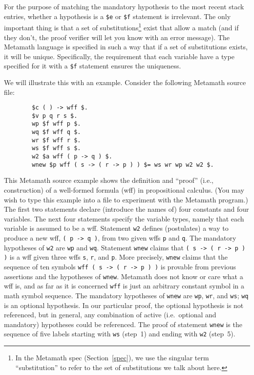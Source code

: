For the purpose of matching the mandatory hypothesis to the most recent stack
entries, whether a hypothesis is a \texttt{\$e} or \texttt{\$f} statement is
irrelevant.  The only important thing is that a set of
substitutions\footnote{In the Metamath spec (Section~\ref{spec}), we use the
singular term ``substitution'' to refer to the set of substitutions we talk
about here.} exist that allow a match (and if they don't, the proof verifier
will let you know with an error message).  The Metamath language is specified
in such a way that if a set of substitutions exists, it will be unique.
Specifically, the requirement that each variable have a type specified for it
with a \texttt{\$f} statement ensures the uniqueness.

We will illustrate this with an example.
Consider the following Metamath source file:
\begin{verbatim}
        $c ( ) -> wff $.
        $v p q r s $.
        wp $f wff p $.
        wq $f wff q $.
        wr $f wff r $.
        ws $f wff s $.
        w2 $a wff ( p -> q ) $.
        wnew $p wff ( s -> ( r -> p ) ) $= ws wr wp w2 w2 $.
\end{verbatim}
This Metamath source example shows the definition and ``proof'' (i.e.,
construction) of a well-formed formula (wff)
in propositional calculus.  (You may wish to type this example into a file to
experiment with the Metamath program.)  The first two statements declare
(introduce the names of) four constants and four variables.  The next four
statements specify the variable types, namely that
each variable is assumed to be a wff.  Statement \texttt{w2} defines (postulates)
a way to produce a new wff, \texttt{( p -> q )}, from two given wffs \texttt{p} and
\texttt{q}. The mandatory hypotheses of \texttt{w2} are \texttt{wp} and \texttt{wq}.
Statement \texttt{wnew} claims that \texttt{( s -> ( r -> p ) )} is a wff given
three wffs \texttt{s}, \texttt{r}, and \texttt{p}.  More precisely, \texttt{wnew} claims
that the sequence of ten symbols \texttt{wff ( s -> ( r -> p ) )} is provable from
previous assertions and the hypotheses of \texttt{wnew}.  Metamath does not know
or care what a wff is, and as far as it is concerned \texttt{wff} is just an
arbitrary constant symbol in a math symbol sequence.  The mandatory hypotheses
of \texttt{wnew} are \texttt{wp}, \texttt{wr}, and \texttt{ws}; \texttt{wq} is an optional
hypothesis.  In our particular proof, the optional hypothesis is not
referenced, but in general, any combination of active (i.e.\ optional and
mandatory) hypotheses could be referenced.  The proof of statement \texttt{wnew}
is the sequence of five labels starting with \texttt{ws} (step~1) and ending with
\texttt{w2} (step~5).

